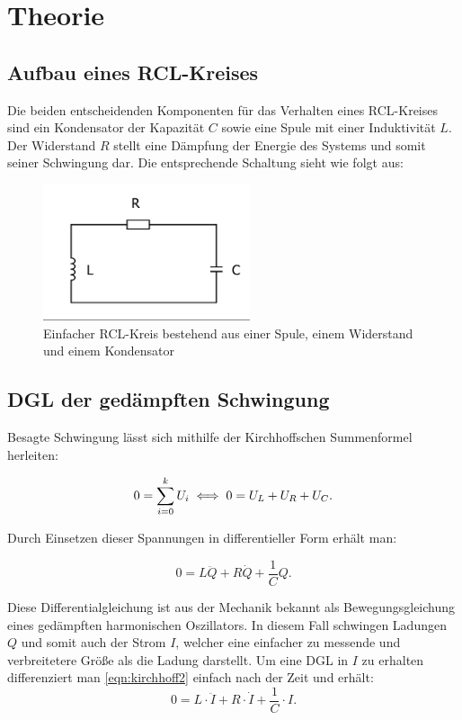 \section{Theorie}
\label{sec:Theorie}
\subsection{Aufbau eines RCL-Kreises}
Die beiden entscheidenden Komponenten für das Verhalten eines RCL-Kreises sind ein Kondensator der Kapazität $C$ sowie eine Spule mit einer Induktivität $L$.
Der Widerstand $R$ stellt eine Dämpfung der Energie des Systems und somit seiner Schwingung dar. Die entsprechende Schaltung sieht wie folgt aus:

\begin{figure}
  \centering
  \includegraphics[height= 4cm]{./logos/schwingkreis.png}
  \caption{Einfacher RCL-Kreis bestehend aus einer Spule, einem Widerstand und einem Kondensator}
  \label{fig:rcl}
\end{figure}


\subsection{DGL der gedämpften Schwingung}
Besagte Schwingung lässt sich mithilfe der Kirchhoffschen Summenformel herleiten:

\begin{equation}
  0= \sum_{i=0}^{k} U_i \\
  \iff  0 = U_L + U_R + U_C .
  \label{eqn:kirchhoff1}
\end{equation}

Durch Einsetzen dieser Spannungen in differentieller Form erhält man:

\begin{equation}
  0= L\ddot{Q} + R  \dot{Q} + \frac{1}{C} Q .
  \label{eqn:kirchhoff2}
\end{equation}

Diese Differentialgleichung ist aus der Mechanik bekannt als Bewegungsgleichung eines gedämpften harmonischen Oszillators.
In diesem Fall schwingen Ladungen $Q$ und somit auch der Strom $I$, welcher eine einfacher zu messende und verbreitetere Größe als die Ladung darstellt.
Um eine DGL in $I$ zu erhalten differenziert man \eqref{eqn:kirchhoff2} einfach nach der Zeit und erhält:
\begin{equation}
  0= L \cdot \ddot{I} + R \cdot \dot{I} + \frac{1}{C} \cdot I .
  \label{eqn:kirchhoff3}
\end{equation}


